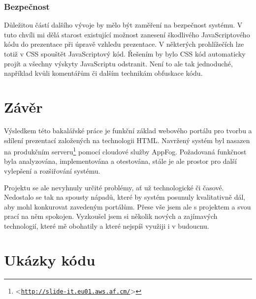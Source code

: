 \documentclass[11pt,twoside,a4paper]{book}
\let\oldUrl\url									%
\renewcommand\url[1]{<\texttt{\oldUrl{#1}}>}
\begin{document}
\subsection{Bezpečnost}
Důležitou částí dalšího vývoje by mělo být zaměření na bezpečnost systému. V tuto chvíli mi dělá starost existující možnost zanesení škodlivého JavaScriptového kódu do prezentace při úpravě vzhledu prezentace. V některých prohlížečích lze totiž v CSS spouštět JavaScriptový kód. Řešením by bylo CSS kód automaticky projít a všechny výskyty JavaScriptu odstranit. Není to ale tak jednoduché, například kvůli komentářům či dalším technikám obfuskace kódu.


\chapter{Závěr}
Výsledkem této bakalářské práce je funkční základ webového portálu pro tvorbu a sdílení prezentací založených na technologii HTML. Navržený systém byl nasazen na produkčním serveru\footnote{\url{http://slide-it.eu01.aws.af.cm/}} pomocí cloudové služby AppFog. Požadovaná funkčnost byla analyzována, implementována a otestována, stále je ale prostor pro další vylepšení a rozšiřování systému.

Projektu se ale nevyhnuly určité problémy, ať už technologické či časové. Nedostalo se tak na spousty nápadů, které by systém posunuly kvalitativně dál, aby mohl konkurovat zavedeným portálům. Přese vše jsem ale s projektem a svou prací na něm spokojen. Vyzkoušel jsem si několik nových a zajímavých technologií, které mě obohatily a které nejspíš využiji i v budoucnu.





{
\def\CS{$\cal C\kern-0.1667em\lower.5ex\hbox{$\cal S$}\kern-0.075em $}

}




\appendix	

\printnomenclature

\chapter{Ukázky kódu}\label{chap:ukazkykodu}
\end{document}
